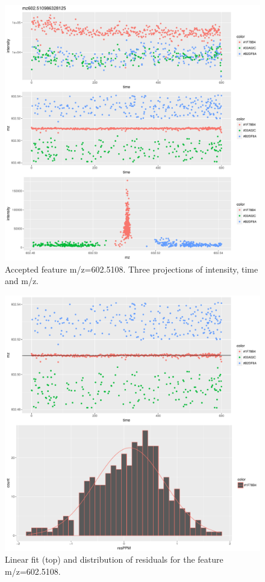 \documentclass[]{article}
\begin{document}
\begin{figure}[H]
\begin{center}
\includegraphics{Supplementary_document_files/figure-latex/cluster.mz.602-1.pdf}
\caption{Accepted feature m/z=602.5108. Three projections of intensity, time and m/z.}
\label{fig:d3.mz.602.5108}
\end{center}
\end{figure}


\begin{figure}[H]
\begin{center}
\includegraphics{Supplementary_document_files/figure-latex/filter.lm.602-1.pdf}
\caption{Linear fit (top) and distribution of residuals for the  feature m/z=602.5108.}
\label{ig:chk.mz.602.5108}
\end{center}
\end{figure}
\end{document}
